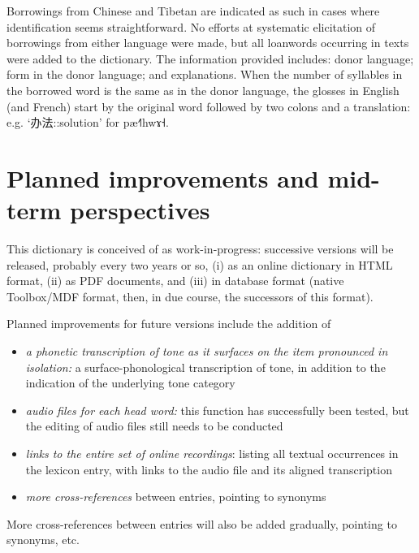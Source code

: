 \documentclass[oldfontcommands,oneside,a4paper,11pt]{article}
\newcommand{\ipa}[1]{{\phon #1}} %
\newcommand{\zh}[1]{{\cn #1}}
\begin{document}
	Borrowings from Chinese and Tibetan are indicated as such in cases where identification seems straightforward. No efforts at systematic elicitation of borrowings from either language were made, but all loanwords occurring in texts were added to the dictionary. The information provided includes: donor language; form in the donor language; and explanations. When the number of syllables in the borrowed word is the same as in the donor language, the glosses in English (and French) start by the original word followed by two colons and a translation: e.g. ‘\zh{办法}::solution' for \ipa{pæ˧˥hwɤ˧}. 
	
	\section{Planned improvements and mid-term perspectives} \label{sec:improv}
	
	This dictionary is conceived of as work-in-progress: successive versions will be released, probably every two years or so, (i) as an online dictionary in HTML format, (ii) as PDF documents, and (iii) in database format (native Toolbox/MDF format, then, in due course, the successors of this format). 
	
	Planned improvements for future versions include the addition of
	\begin{itemize}
		\item \textit{a phonetic transcription of tone as it surfaces on the item pronounced in isolation:} a surface-phonological transcription of tone, in addition to the indication of the underlying tone category
		\item \textit{audio files for each head word:} this function has successfully been tested, but the editing of audio files still needs to be conducted
		\item \textit{links to the entire set of online recordings}: listing all textual occurrences in the lexicon entry, with links to the audio file and its aligned transcription
		\item \textit{more cross-references} between entries, pointing to synonyms
	\end{itemize}
	
	More cross-references between entries will also be added gradually, pointing to synonyms, etc.
	
\end{document}
